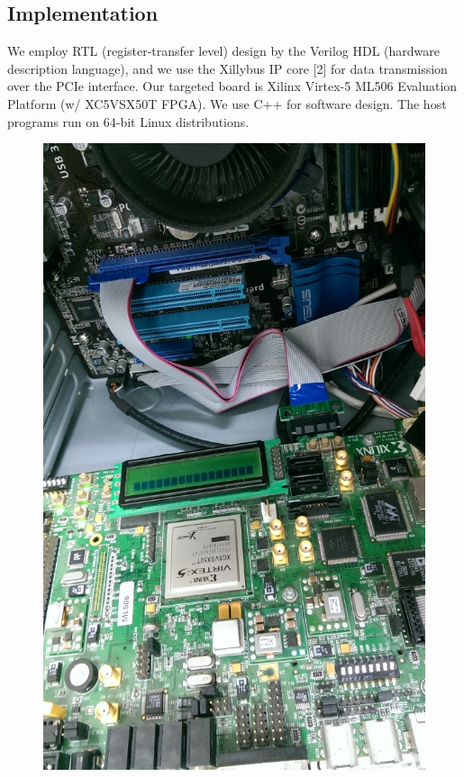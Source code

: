 \documentclass{acm_proc_article-sp}
\begin{document}
\subsection{Implementation}
We employ RTL (register-transfer level) design by the Verilog HDL (hardware description language), and we use the Xillybus IP core [2] for data transmission over the PCIe interface. Our targeted board is Xilinx Virtex-5 ML506 Evaluation Platform (w/ XC5VSX50T FPGA). We use C++ for software design. The host programs run on 64-bit Linux distributions.
\begin{figure}[H]
  \includegraphics[width=\linewidth,natwidth=600,natheight=984]{fpga_connect.jpg}
  \label{fig:fpga_connect}
\end{figure}
\end{document}
